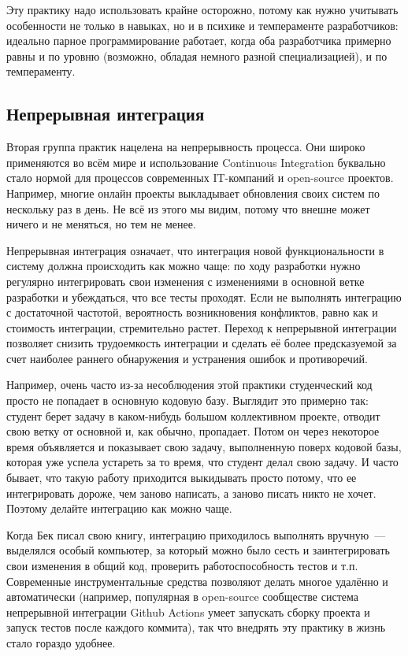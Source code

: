 \documentclass{../../text-style}
\begin{document}
Эту практику надо использовать крайне осторожно, потому как нужно учитывать особенности не только в навыках, но и в психике и темпераменте разработчиков: идеально парное программирование работает, когда оба разработчика примерно равны и по уровню (возможно, обладая немного разной специализацией), и по темпераменту.

\subsection{Непрерывная интеграция}

Вторая группа практик нацелена на непрерывность процесса. Они широко применяются во всём мире и использование Continuous Integration буквально стало нормой для процессов современных IT-компаний и open-source проектов. Например, многие онлайн проекты выкладывает обновления своих систем по нескольку раз в день. Не всё из этого мы видим, потому что внешне может ничего и не меняться, но тем не менее.

Непрерывная интеграция означает, что интеграция новой функциональности в систему должна происходить как можно чаще: по ходу разработки нужно регулярно интегрировать свои изменения с изменениями в основной ветке разработки и убеждаться, что все тесты проходят. Если не выполнять интеграцию с достаточной частотой, вероятность возникновения конфликтов, равно как и стоимость интеграции, стремительно растет. Переход к непрерывной интеграции позволяет снизить трудоемкость интеграции и сделать её более предсказуемой за счет наиболее раннего обнаружения и устранения ошибок и противоречий.

Например, очень часто из-за несоблюдения этой практики студенческий код просто не попадает в основную кодовую базу. Выглядит это примерно так: студент берет задачу в каком-нибудь большом коллективном проекте, отводит свою ветку от основной и, как обычно, пропадает. Потом он через некоторое время объявляется и показывает свою задачу, выполненную поверх кодовой базы, которая уже успела устареть за то время, что студент делал свою задачу. И часто бывает, что такую работу приходится выкидывать просто потому, что ее интегрировать дороже, чем заново написать, а заново писать никто не хочет. Поэтому делайте интеграцию как можно чаще.

Когда Бек писал свою книгу, интеграцию приходилось выполнять вручную~--- выделялся особый компьютер, за который можно было сесть и заинтегрировать свои изменения в общий код, проверить работоспособность тестов и т.п. Современные инструментальные средства позволяют делать многое удалённо и автоматически (например, популярная в open-source сообществе система непрерывной интеграции Github Actions умеет запускать сборку проекта и запуск тестов после каждого коммита), так что внедрять эту практику в жизнь стало гораздо удобнее.
\end{document}
